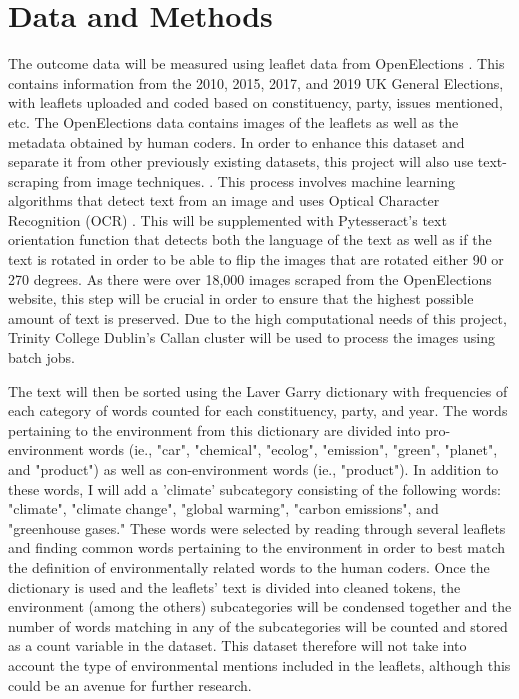 \documentclass[preprint]{elsarticle} %
\begin{document}
	
	\section{Data and Methods}

The outcome data will be measured using leaflet data from OpenElections \citep{milazzo2020openelections}. This contains information from the 2010, 2015, 2017, and 2019 UK General Elections, with leaflets uploaded and coded based on constituency, party, issues mentioned, etc. The OpenElections data contains images of the leaflets as well as the metadata obtained by human coders. In order to enhance this dataset and separate it from other previously existing datasets, this project will also use text-scraping from image techniques. \citep{KerasocrKeras_ocrDocumentation,hoffstaetterPytesseractPythontesseractPython}. This process involves machine learning algorithms that detect text from an image and uses Optical Character Recognition (OCR) \citep{madhugiriExtractTextImages2022}. This will be supplemented with Pytesseract's text orientation function that detects both the language of the text as well as if the text is rotated \citep{rosebrockCorrectingTextOrientation2022} in order to be able to flip the images that are rotated either 90 or 270 degrees. As there were over 18,000 images scraped from the OpenElections website, this step will be crucial in order to ensure that the highest possible amount of text is preserved. Due to the high computational needs of this project, Trinity College Dublin's Callan cluster will be used to process the images using batch jobs.



The text will then be sorted using the Laver Garry dictionary \citep{laverEstimatingPolicyPositions2000} with frequencies of each category of words counted for each constituency, party, and year. The words pertaining to the environment from this dictionary are divided into pro-environment words (ie., "car", "chemical", "ecolog", "emission", "green", "planet", and "product") as well as con-environment words (ie., "product"). In addition to these words, I will add a 'climate' subcategory consisting of the following words: "climate", "climate change", "global warming", "carbon emissions", and "greenhouse gases." These words were selected by reading through several leaflets and finding common words pertaining to the environment in order to best match the definition of environmentally related words to the human coders. Once the dictionary is used and the leaflets' text is divided into cleaned tokens, the environment (among the others) subcategories will be condensed together and the number of words matching in any of the subcategories will be counted and stored as a count variable in the dataset. This dataset therefore will not take into account the type of environmental mentions included in the leaflets, although this could be an avenue for further research. 
\end{document}
